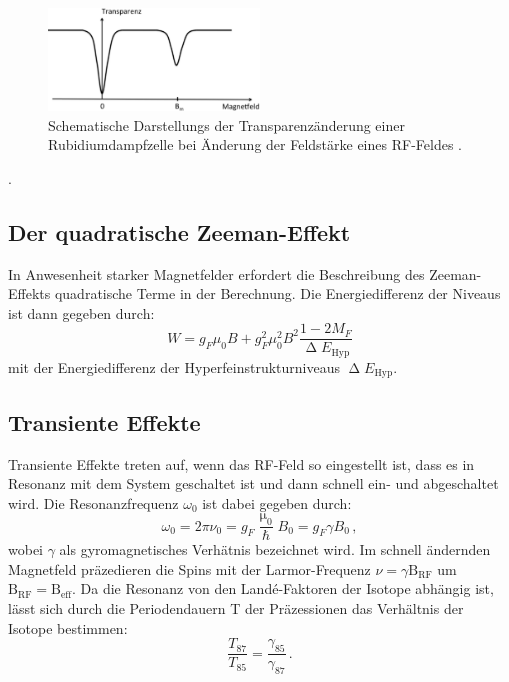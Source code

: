 \begin{figure}
  \centering
  \includegraphics[width=0.5\textwidth]{Bilder/Beispiel}
  \caption{Schematische Darstellungs der Transparenzänderung einer Rubidiumdampfzelle bei Änderung der Feldstärke eines RF-Feldes \cite{Anleitung}.}
  \label{Kreislauf}
\end{figure}.
\subsection{Der quadratische Zeeman-Effekt}
In Anwesenheit starker Magnetfelder erfordert die Beschreibung des Zeeman-Effekts quadratische Terme in der Berechnung. Die Energiedifferenz der Niveaus ist dann gegeben durch:
\begin{equation}
  W = g_F\mu_\text{0}B+g^2_F\mu^2_\text{0}B^2\frac{1-2M_F}{\upDelta E_\text{Hyp}}
  \label{eq:quadratisch}
\end{equation}
mit der Energiedifferenz der Hyperfeinstrukturniveaus $\upDelta E_\text{Hyp}$.
\subsection{Transiente Effekte}
Transiente Effekte treten auf, wenn das RF-Feld so eingestellt ist, dass es in Resonanz mit dem System geschaltet ist und dann schnell ein- und abgeschaltet wird. Die Resonanzfrequenz $\omega_0$ ist dabei gegeben durch:
\begin{equation}
\omega_0=2\pi\nu_0=g_F\frac{\upmu_0}{\hbar}B_0=g_F\gamma B_0\,,
\end{equation}
wobei $\gamma$ als gyromagnetisches Verhätnis bezeichnet wird. Im schnell ändernden Magnetfeld präzedieren die Spins mit der Larmor-Frequenz $\nu=\gamma\text{B}_\text{RF}$ um $\text{B}_\text{RF}=\text{B}_\text{eff}$. Da die Resonanz von den Landé-Faktoren der Isotope abhängig ist, lässt sich durch die Periodendauern T der Präzessionen das Verhältnis der Isotope bestimmen:
\begin{equation}
  \frac{T_{87}}{T_{85}}=\frac{\gamma_{85}}{\gamma_{87}}\,.
\end{equation}
